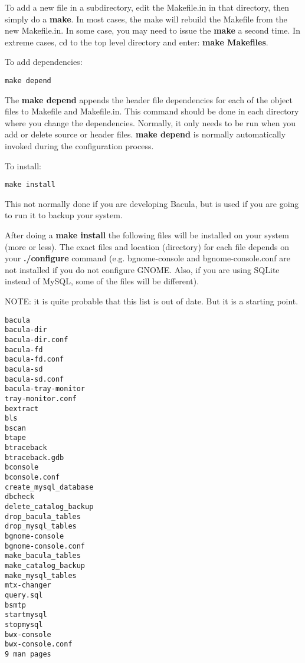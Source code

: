 To add a new file in a subdirectory, edit the Makefile.in in that directory,
then simply do a {\bf make}. In most cases, the make will rebuild the Makefile
from the new Makefile.in. In some case, you may need to issue the {\bf make} a
second time. In extreme cases, cd to the top level directory and enter: {\bf
make Makefiles}. 

To add dependencies: 

\footnotesize
\begin{verbatim}
make depend
\end{verbatim}
\normalsize

The {\bf make depend} appends the header file dependencies for each of the
object files to Makefile and Makefile.in. This command should be done in each
directory where you change the dependencies. Normally, it only needs to be run
when you add or delete source or header files. {\bf make depend} is normally
automatically invoked during the configuration process. 

To install: 

\footnotesize
\begin{verbatim}
make install
\end{verbatim}
\normalsize

This not normally done if you are developing Bacula, but is used if you are
going to run it to backup your system. 

After doing a {\bf make install} the following files will be installed on your
system (more or less). The exact files and location (directory) for each file
depends on your {\bf ./configure} command (e.g. bgnome-console and
bgnome-console.conf are not installed if you do not configure GNOME. Also, if
you are using SQLite instead of MySQL, some of the files will be different). 

NOTE: it is quite probable that this list is out of date.  But it is a
starting point.

\footnotesize
\begin{verbatim}
bacula
bacula-dir
bacula-dir.conf
bacula-fd
bacula-fd.conf
bacula-sd
bacula-sd.conf
bacula-tray-monitor
tray-monitor.conf
bextract
bls
bscan
btape
btraceback
btraceback.gdb
bconsole
bconsole.conf
create_mysql_database
dbcheck
delete_catalog_backup
drop_bacula_tables
drop_mysql_tables
bgnome-console
bgnome-console.conf
make_bacula_tables
make_catalog_backup
make_mysql_tables
mtx-changer
query.sql
bsmtp
startmysql
stopmysql
bwx-console
bwx-console.conf
9 man pages
\end{verbatim}
\normalsize


